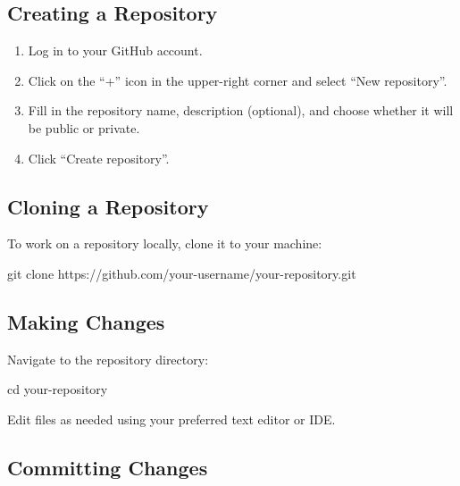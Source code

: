 \documentclass[
  letterpaper,
  DIV=11,
  numbers=noendperiod]{scrreprt}
\newenvironment{Shaded}{\begin{snugshade}}{\end{snugshade}}
\newcommand{\BuiltInTok}[1]{\textcolor[rgb]{0.00,0.23,0.31}{#1}}
\newcommand{\FunctionTok}[1]{\textcolor[rgb]{0.28,0.35,0.67}{#1}}
\newcommand{\NormalTok}[1]{\textcolor[rgb]{0.00,0.23,0.31}{#1}}
\providecommand{\tightlist}{%
  \setlength{\itemsep}{0pt}\setlength{\parskip}{0pt}}\usepackage{longtable,booktabs,array}
\begin{document}
\subsection{Creating a Repository}\label{creating-a-repository}

\begin{enumerate}
\def\labelenumi{\arabic{enumi}.}
\tightlist
\item
  Log in to your GitHub account.
\item
  Click on the ``+'' icon in the upper-right corner and select ``New
  repository''.
\item
  Fill in the repository name, description (optional), and choose
  whether it will be public or private.
\item
  Click ``Create repository''.
\end{enumerate}

\subsection{Cloning a Repository}\label{cloning-a-repository-1}

To work on a repository locally, clone it to your machine:

\begin{Shaded}
\begin{Highlighting}[]
\FunctionTok{git}\NormalTok{ clone https://github.com/your{-}username/your{-}repository.git}
\end{Highlighting}
\end{Shaded}

\subsection{Making Changes}\label{making-changes}

Navigate to the repository directory:

\begin{Shaded}
\begin{Highlighting}[]
\BuiltInTok{cd}\NormalTok{ your{-}repository}
\end{Highlighting}
\end{Shaded}

Edit files as needed using your preferred text editor or IDE.

\subsection{Committing Changes}\label{committing-changes-2}
\end{document}
